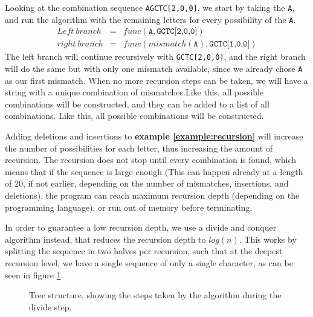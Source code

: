 \documentclass[12pt]{article}
\theoremstyle{definition}
\begin{document}
\begin{example}[label=example:recursion]
Looking at the combination sequence \texttt{AGCTC[2,0,0]}, we start by taking the \texttt{A}, and run the algorithm with the remaining letters for every possibility of the \texttt{A}.
\begin{eqnarray}
	Left\ branch &=& func(\texttt{A}, \texttt{GCTC[2,0,0]}) \\
	right\ branch &=& func(mismatch(\texttt{A}), \texttt{GCTC[1,0,0]})
\end{eqnarray}
The left branch will continue recursively with \texttt{GCTC[2,0,0]}, and the right branch will do the same but with only one mismatch available, since we already chose \texttt{A} as our first mismatch. When no more recursion steps can be taken, we will have a string with a unique combination of mismatches.Like this, all possible combinations will be constructed, and they can be added to a list of all combinations. Like this, all possible combinations will be constructed.
\end{example}

Adding deletions and insertions to \textbf{example \ref{example:recursion}} will increase the number of possibilities for each letter, thus increasing the amount of recursion. The recursion does not stop until every combination is found, which means that if the sequence is large enough (This can happen already at a length of 20, if not earlier, depending on the number of mismatches, insertions, and deletions), the program can reach maximum recursion depth (depending on the programming language), or run out of memory before terminating.

In order to guarantee a low recursion depth, we use a divide and conquer algorithm\cite{Algorithms} instead, that reduces the recursion depth to $log(n)$. This works by splitting the sequence in two halves per recursion, such that at the deepest recursion level, we have a single sequence of only a single character, as can be seen in figure \ref{fig:tree_example}. 

\begin{figure}[H]
	\centering
	\caption{Tree structure, showing the steps taken by the algorithm during the divide step.}
	\label{fig:tree_example}
\end{figure}
\end{document}
